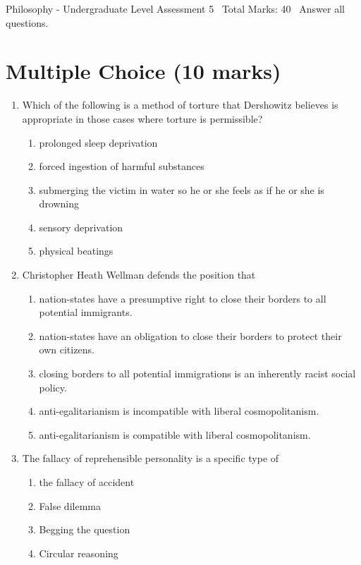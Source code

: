 \documentclass[12pt]{article}
\begin{document}
\begin{center}
Philosophy - Undergraduate Level Assessment 5 \
Total Marks: 40 \
Answer all questions.
\end{center}

\section*{Multiple Choice (10 marks)}
\begin{enumerate}[label=\arabic*.]
\item Which of the following is a method of torture that Dershowitz believes is appropriate in
those cases where torture is permissible?
\begin{enumerate}[label=(\alph*)]
    \item prolonged sleep deprivation
    \item forced ingestion of harmful substances
    \item submerging the victim in water so he or she feels as if he or she is drowning
    \item sensory deprivation
    \item physical beatings
\end{enumerate}
\item Christopher Heath Wellman defends the position that
\begin{enumerate}[label=(\alph*)]
    \item nation-states have a presumptive right to close their borders to all potential immigrants.
    \item nation-states have an obligation to close their borders to protect their own citizens.
    \item closing borders to all potential immigrations is an inherently racist social policy.
    \item anti-egalitarianism is incompatible with liberal cosmopolitanism.
    \item anti-egalitarianism is compatible with liberal cosmopolitanism.
\end{enumerate}
\item The fallacy of reprehensible personality is a specific type of
\begin{enumerate}[label=(\alph*)]
    \item the fallacy of accident
    \item False dilemma
    \item Begging the question
    \item Circular reasoning
\end{enumerate}

\end{enumerate}
\end{document}
